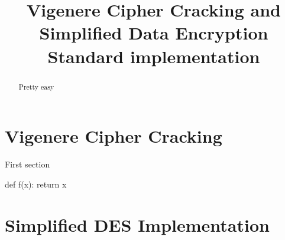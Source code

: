 \documentclass{article}
\title{\textbf{ Vigenere Cipher Cracking and Simplified Data Encryption Standard implementation}}
\author{}
\date{}
\begin{document}
\maketitle \thispagestyle{fancy}

\begin{abstract}
    Pretty easy
    
\end{abstract}

\section{Vigenere Cipher Cracking}
    First section \cite{vigenere}



\begin{python}
    def f(x):
        return x
\end{python}

\section{Simplified DES Implementation}




\end{document}
